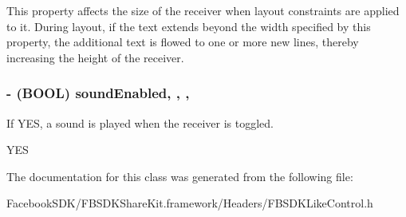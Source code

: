 This property affects the size of the receiver when layout constraints are applied to it. During layout, if the text extends beyond the width specified by this property, the additional text is flowed to one or more new lines, thereby increasing the height of the receiver. \hypertarget{interface_f_b_s_d_k_like_control_af2293652063a0b1e8e3d8ba73b343d1c}{
\subsubsection[{sound\-Enabled}]{\setlength{\rightskip}{0pt plus 5cm}-\/ (B\-O\-O\-L) sound\-Enabled\hspace{0.3cm}{\ttfamily [read]}, {\ttfamily [write]}, {\ttfamily [nonatomic]}, {\ttfamily [assign]}}}\label{interface_f_b_s_d_k_like_control_af2293652063a0b1e8e3d8ba73b343d1c}
If Y\-E\-S, a sound is played when the receiver is toggled.

Y\-E\-S 

The documentation for this class was generated from the following file\-:\begin{DoxyCompactItemize}
\item 
Facebook\-S\-D\-K/\-F\-B\-S\-D\-K\-Share\-Kit.\-framework/\-Headers/F\-B\-S\-D\-K\-Like\-Control.\-h\end{DoxyCompactItemize}
